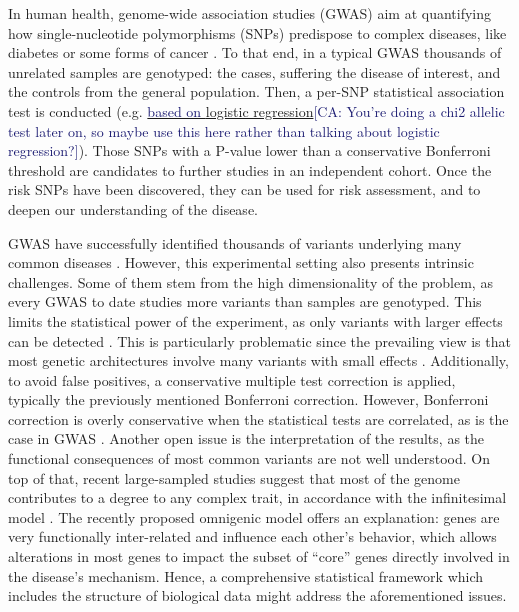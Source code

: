 \documentclass[twocolumn, 11pt]{article}
\newcommand{\cazcom}[2]{{\uline{#1}}\unskip\space\textcolor{MidnightBlue}{[CA: #2]}}
\newcommand{\caz}[2]{{\sout{#1}}\unskip\space\textcolor{MidnightBlue}{#2}}
\begin{document}
In human health, genome-wide association studies (GWAS) aim at quantifying how single-nucleotide polymorphisms (SNPs) predispose to complex diseases, like diabetes or some forms of cancer \cite{bush_chapter_2012}. To that end, in a typical GWAS thousands of unrelated samples are genotyped: the cases, suffering the disease of interest, and the controls from the general population. Then, a per-SNP statistical association test is conducted (e.g. \cazcom{\caz{}{based on }logistic regression}{You're doing a chi2 allelic test later on, so maybe use this here rather than talking about logistic regression?}). Those SNPs with a P-value lower than a conservative Bonferroni threshold are candidates to further studies in an independent cohort. Once the risk SNPs have been discovered, they can be used for risk assessment, and to deepen our understanding of the disease.

GWAS have successfully identified thousands of variants underlying many common diseases \cite{buniello_nhgri-ebi_2019}. However, this experimental setting also presents intrinsic challenges. Some of them stem from the high dimensionality of the problem, as every GWAS to date studies more variants than samples are genotyped. This limits the statistical power of the experiment, as only variants with larger effects can be detected \cite{visscher_10_2017}. This is particularly problematic since the prevailing view is that most genetic architectures involve many variants with small effects \cite{visscher_10_2017}. Additionally, to avoid false positives, a conservative multiple test correction is applied, typically the previously mentioned Bonferroni correction. However, Bonferroni correction is overly conservative when the statistical tests are correlated, as is the case in GWAS \cite{wang_statistical_2018}. Another open issue is the interpretation of the results, as the functional consequences of most common variants are not well understood. On top of that, recent large-sampled studies suggest that most of the genome contributes to a degree to any complex trait, in accordance with the infinitesimal model \cite{barton_infinitesimal_2017}. The recently proposed omnigenic model \cite{boyle_expanded_2017} offers an explanation: genes are very functionally inter-related and influence each other's behavior, which allows alterations in most genes to impact the subset of ``core'' genes directly involved in the disease's mechanism. Hence, a comprehensive statistical framework which includes the structure of biological data might address the aforementioned issues.
\end{document}
